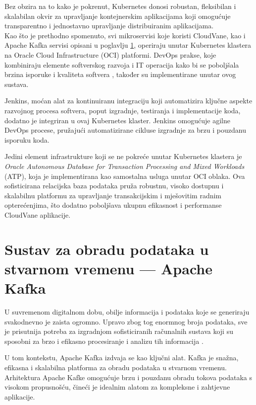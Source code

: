 \documentclass[times, utf8, diplomski]{fer}
\begin{document}
Bez obzira na to kako je pokrenut, Kubernetes donosi robustan, fleksibilan i skalabilan okvir za upravljanje kontejnerskim aplikacijama koji omogućuje transparentno i jednostavno upravljanje distribuiranim aplikacijama. \\

Kao što je prethodno spomenuto, svi mikroservisi koje koristi CloudVane, kao i Apache Kafka servisi opisani u poglavlju \ref{sec:kafka}, operiraju unutar Kubernetes klastera na Oracle Cloud Infrastructure (OCI) platformi. DevOps prakse, koje kombiniraju elemente softverskog razvoja  i IT operacija  kako bi se poboljšala brzina isporuke i kvaliteta softvera \citep{courtemanche_what_nodate}, također su implementirane unutar ovog sustava.

Jenkins, moćan alat za kontinuiranu integraciju koji automatizira ključne aspekte razvojnog procesa softvera, poput izgradnje, testiranja i implementacije koda, dodatno je integriran u ovaj Kubernetes klaster. Jenkins omogućuje agilne DevOps procese, pružajući automatizirane cikluse izgradnje za brzu i pouzdanu isporuku koda.

Jedini element infrastrukture koji se ne pokreće unutar Kubernetes klastera je \emph{Oracle Autonomous Database for Transaction Processing and Mixed Workloads} (ATP), koja je implementirana kao samostalna usluga unutar OCI oblaka. Ova sofisticirana relacijska baza podataka pruža robustnu, visoko dostupnu i skalabilnu platformu za upravljanje transakcijskim i mješovitim radnim opterećenjima, što dodatno poboljšava ukupnu efikasnost i performanse CloudVane aplikacije.


\section{Sustav za obradu podataka u stvarnom vremenu --- Apache Kafka}
\label{sec:kafka}

U suvremenom digitalnom dobu, obilje informacija i podataka koje se generiraju svakodnevno je zaista ogromno. Upravo zbog tog enormnog broja podataka, sve je prisutnija potreba za izgradnjom sofisticiranih računalnih sustava koji su sposobni za brzo i efikasno procesiranje i analizu tih informacija \citep{cubek_apache_2022}.

U tom kontekstu, Apache Kafka izdvaja se kao ključni alat. Kafka je snažna, efikasna i skalabilna platforma za obradu podataka u stvarnom vremenu. Arhitektura Apache Kafke omogućuje brzu i pouzdanu obradu tokova podataka s visokom propusnošću, čineći je idealnim alatom za kompleksne i zahtjevne aplikacije.
\end{document}
